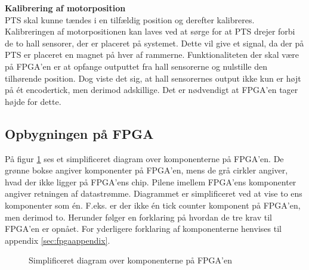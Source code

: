 \textbf{Kalibrering af motorposition}\\
PTS skal kunne tændes i en tilfældig position og derefter kalibreres.
Kalibreringen af motorpositionen kan laves ved at sørge for at PTS drejer forbi 
de to hall sensorer, der er placeret på systemet. Dette vil give et signal, da 
der på PTS er placeret en magnet på hver af rammerne.
Funktionaliteten der skal være på FPGA'en er at opfange outputtet fra 
hall sensorerne og nulstille den tilhørende position.
Dog viste det sig, at hall sensorernes output ikke kun er højt på ét encodertick, 
men derimod adskillige. Det er nødvendigt at FPGA'en tager højde for 
dette.

\subsection{Opbygningen på FPGA}
På figur \ref{fig:FPGA_blok} ses et simplificeret diagram over komponenterne på FPGA'en. 
De grønne bokse angiver komponenter på FPGA'en, mens de grå cirkler angiver, hvad der ikke ligger på 
FPGA'ens chip. Pilene imellem FPGA'ens komponenter angiver retningen af 
datastrømme. Diagrammet er simplificeret ved at vise to ens komponenter som én. 
F.eks. er der ikke én tick counter komponent på FPGA'en, men derimod to.
Herunder følger en forklaring på hvordan de tre krav til FPGA'en er opnået. For 
yderligere forklaring af komponenterne henvises til appendix 
\ref{sec:fpgaappendix}.

\begin{figure}[!th]
\centering
\begin{tikzpicture}[node distance = 5 cm,scale=1]

\end{tikzpicture}
\caption[Diagram over FPGA komponenter]{Simplificeret diagram over komponenterne på FPGA'en}
\label{fig:FPGA_blok}
\end{figure}

